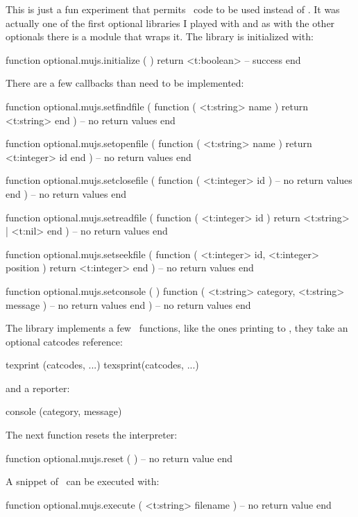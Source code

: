 \stopsubsubsubject

\startsubsubsubject[title=mujs]

This is just a fun experiment that permits \JAVASCRIPT\ code to be used instead of
\LUA. It was actually one of the first optional libraries I played with and as
with the other optionals there is a module that wraps it. The library is
initialized with:

\starttyping[option=LUA]
function optional.mujs.initialize ( )
    return <t:boolean> -- success
end
\stoptyping

There are a few  callbacks than need to be implemented:

\starttyping[option=LUA]
function optional.mujs.setfindfile (
    function ( <t:string> name )
        return <t:string>
    end
)
    -- no return values
end

function optional.mujs.setopenfile  (
    function ( <t:string> name )
        return <t:integer> id
    end
)
    -- no return values
end

function optional.mujs.setclosefile (
    function ( <t:integer> id )
        -- no return values
    end
)
    -- no return values
end

function optional.mujs.setreadfile (
    function ( <t:integer> id )
        return <t:string> | <t:nil>
    end
)
    -- no return values
end

function optional.mujs.setseekfile (
    function ( <t:integer> id, <t:integer> position )
        return <t:integer>
    end
)
    -- no return values
end

function optional.mujs.setconsole ( )
    function ( <t:string> category, <t:string> message )
        -- no return values
    end
)
    -- no return values
end
\stoptyping

The library implements a few \JAVASCRIPT\ functions, like the ones
printing to \TEX, they take an optional catcodes reference:

\starttyping
texprint (catcodes, ...)
texsprint(catcodes, ...)
\stoptyping

and a reporter:

\starttyping
console  (category, message)
\stoptyping

The next function resets the interpreter:

\starttyping[option=LUA]
function optional.mujs.reset ( )
    -- no return value
end
\stoptyping

A snippet of \JAVASCRIPT\ can be executed with:

\starttyping[option=LUA]
function optional.mujs.execute ( <t:string> filename )
    -- no return value
end
\stoptyping

